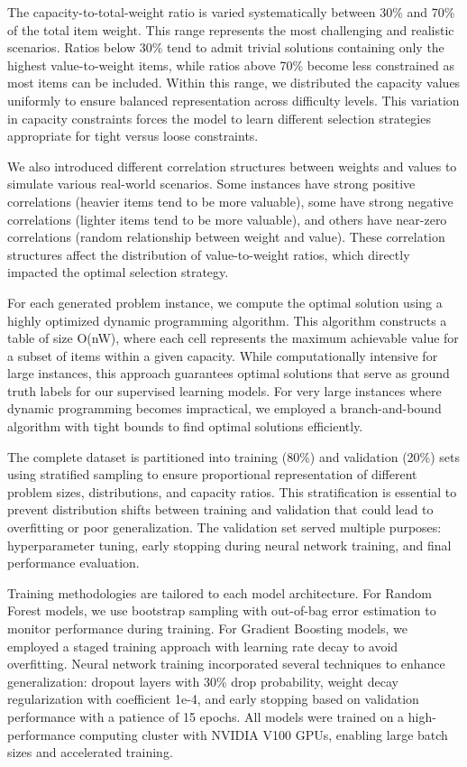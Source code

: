 \documentclass[conference, a4paper]{IEEEtran}
\begin{document}
The capacity-to-total-weight ratio is varied systematically between 30\% and 70\% of the total item weight. This range represents the most challenging and realistic scenarios. Ratios below 30\% tend to admit trivial solutions containing only the highest value-to-weight items, while ratios above 70\% become less constrained as most items can be included. Within this range, we distributed the capacity values uniformly to ensure balanced representation across difficulty levels. This variation in capacity constraints forces the model to learn different selection strategies appropriate for tight versus loose constraints.

We also introduced different correlation structures between weights and values to simulate various real-world scenarios. Some instances have strong positive correlations (heavier items tend to be more valuable), some have strong negative correlations (lighter items tend to be more valuable), and others have near-zero correlations (random relationship between weight and value). These correlation structures affect the distribution of value-to-weight ratios, which directly impacted the optimal selection strategy.

For each generated problem instance, we compute the optimal solution using a highly optimized dynamic programming algorithm. This algorithm constructs a table of size O(nW), where each cell represents the maximum achievable value for a subset of items within a given capacity. While computationally intensive for large instances, this approach guarantees optimal solutions that serve as ground truth labels for our supervised learning models. For very large instances where dynamic programming becomes impractical, we employed a branch-and-bound algorithm with tight bounds to find optimal solutions efficiently.

The complete dataset is partitioned into training (80\%) and validation (20\%) sets using stratified sampling to ensure proportional representation of different problem sizes, distributions, and capacity ratios. This stratification is essential to prevent distribution shifts between training and validation that could lead to overfitting or poor generalization. The validation set served multiple purposes: hyperparameter tuning, early stopping during neural network training, and final performance evaluation.

Training methodologies are tailored to each model architecture. For Random Forest models, we use bootstrap sampling with out-of-bag error estimation to monitor performance during training. For Gradient Boosting models, we employed a staged training approach with learning rate decay to avoid overfitting. Neural network training incorporated several techniques to enhance generalization: dropout layers with 30\% drop probability, weight decay regularization with coefficient 1e-4, and early stopping based on validation performance with a patience of 15 epochs. All models were trained on a high-performance computing cluster with NVIDIA V100 GPUs, enabling large batch sizes and accelerated training.
\end{document}
